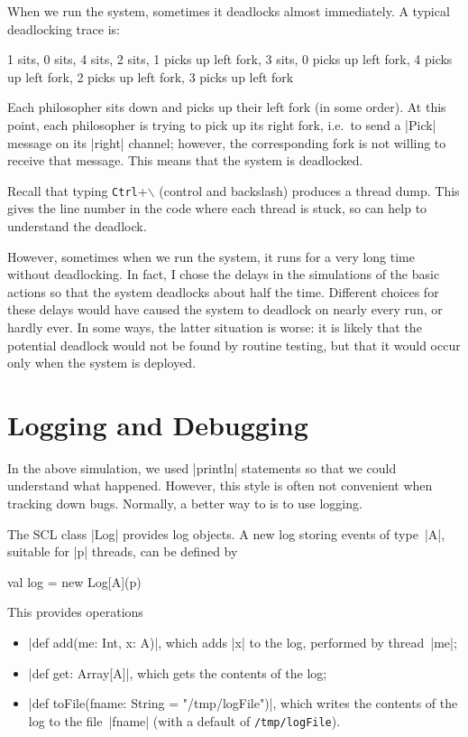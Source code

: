 When we run the system, sometimes it deadlocks almost immediately.  A typical
deadlocking trace is:
%
\begin{scala}
1 sits,  0 sits,  4 sits,  2 sits,  1 picks up left fork, 3 sits,  0 picks up left fork,  
4 picks up left fork, 2 picks up left fork,  3 picks up left fork
\end{scala}
%
Each philosopher sits down and picks up their left fork (in some order).  At
this point, each philosopher is trying to pick up its right fork, i.e.~to send
a |Pick| message on its |right| channel; however, the corresponding fork is
not willing to receive that message.  This means that the system is
deadlocked.

Recall that typing \texttt{Ctrl}+$\backslash$ (control and backslash) produces
a thread dump.  This gives the line number in the code where each thread is
stuck, so can help to understand the deadlock.

However, sometimes when we run the system, it runs for a very long time
without deadlocking.  In fact, I chose the delays in the simulations of the
basic actions so that the system deadlocks about half the time.  Different
choices for these delays would have caused the system to deadlock on nearly
every run, or hardly ever.  In some ways, the latter situation is worse: it is
likely that the potential deadlock would not be found by routine testing, but
that it would occur only when the system is deployed.


\section{Logging and Debugging}

In the above simulation, we used |println| statements so that we could
understand what happened.  However, this style is often not convenient when
tracking down bugs.  Normally, a better way to is to use logging.

The SCL class |Log| provides log objects.
%
A new log storing events of type~|A|, suitable for |p| threads,
can be defined by
\begin{scala}
  val log = new Log[A](p)
\end{scala}
%
This provides operations
%
\begin{itemize}
\item |def add(me: Int, x: A)|, which adds |x| to the log,
performed by thread~|me|;

\item |def get: Array[A]|, which gets the contents of the log;

\item |def toFile(fname: String = "/tmp/logFile")|, which writes the contents
  of the log to the file~|fname| (with a default of \texttt{/tmp/logFile}).
\end{itemize}

